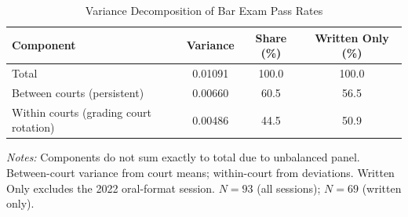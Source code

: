 \begin{table}[htbp]
\centering
\caption{Variance Decomposition of Bar Exam Pass Rates}
\label{tab:variance}
\begin{tabular}{lccc}
\toprule
Component & Variance & Share (\%) & Written Only (\%) \\
\midrule
Total & 0.01091 & 100.0 & 100.0 \\
Between courts (persistent) & 0.00660 & 60.5 & 56.5 \\
Within courts (grading court rotation) & 0.00486 & 44.5 & 50.9 \\
\bottomrule
\end{tabular}
\begin{minipage}{0.9\textwidth}
\footnotesize
\textit{Notes:} Components do not sum exactly to total due to unbalanced panel. Between-court variance from court means; within-court from deviations. Written Only excludes the 2022 oral-format session. $N = 93$ (all sessions); $N = 69$ (written only).
\end{minipage}
\end{table}
